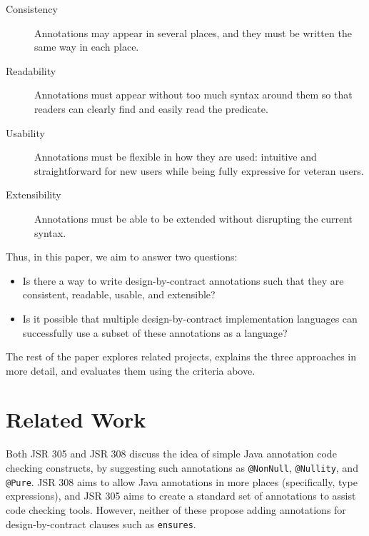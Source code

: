 \documentclass{llncs}
\begin{document}
\begin{description}

\item[Consistency]

Annotations may appear in several places, and they must be written the same way in each place.

\item[Readability]

Annotations must appear without too much syntax around them so that readers can clearly find and easily read the predicate.

\item[Usability]

Annotations must be flexible in how they are used: intuitive and straightforward for new users while being fully expressive for veteran users.

\item[Extensibility]

Annotations must be able to be extended without disrupting the current syntax.

\end{description}

Thus, in this paper, we aim to answer two questions:

\begin{itemize}

\item Is there a way to write design-by-contract annotations such that they are consistent, readable, usable, and extensible?

\item Is it possible that multiple design-by-contract implementation languages can successfully use a subset of these annotations as a language?

\end{itemize}

The rest of the paper explores related projects, explains the three approaches in more detail, and evaluates them using the criteria above.

\section{Related Work}

Both JSR 305 \cite{SunJSR30506} and JSR 308 \cite{SunJSR30807} discuss the idea of simple Java annotation code checking constructs, by suggesting such annotations as \lstinline[language={[JML5]Java}]{@NonNull}, \lstinline[language={[JML5]Java}]{@Nullity}, and \lstinline[language={[JML5]Java}]{@Pure}.  JSR 308 aims to allow Java annotations in more places (specifically, type expressions), and JSR 305 aims to create a standard set of annotations to assist code checking tools.  However, neither of these propose adding annotations for design-by-contract clauses such as \lstinline[language={[JML5]Java}]{ensures}.
\end{document}
